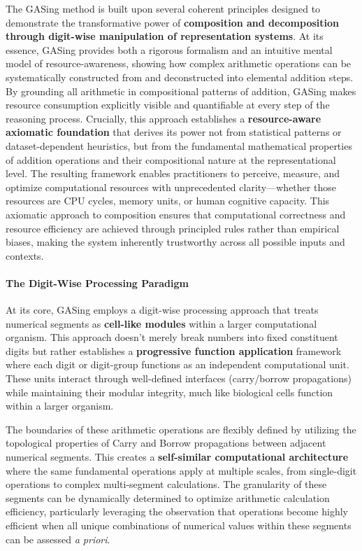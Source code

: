 The GASing method is built upon several coherent principles designed to demonstrate the transformative power of \textbf{composition and decomposition through digit-wise manipulation of representation systems}. At its essence, GASing provides both a rigorous formalism and an intuitive mental model of resource-awareness, showing how complex arithmetic operations can be systematically constructed from and deconstructed into elemental addition steps. By grounding all arithmetic in compositional patterns of addition, GASing makes resource consumption explicitly visible and quantifiable at every step of the reasoning process. Crucially, this approach establishes a \textbf{resource-aware axiomatic foundation} that derives its power not from statistical patterns or dataset-dependent heuristics, but from the fundamental mathematical properties of addition operations and their compositional nature at the representational level. The resulting framework enables practitioners to perceive, measure, and optimize computational resources with unprecedented clarity—whether those resources are CPU cycles, memory units, or human cognitive capacity. This axiomatic approach to composition ensures that computational correctness and resource efficiency are achieved through principled rules rather than empirical biases, making the system inherently trustworthy across all possible inputs and contexts.
\paragraph{The Digit-Wise Processing Paradigm}

At its core, GASing employs a digit-wise processing approach that treats numerical segments as \textbf{cell-like modules} within a larger computational organism. This approach doesn't merely break numbers into fixed constituent digits but rather establishes a \textbf{progressive function application} framework where each digit or digit-group functions as an independent computational unit. These units interact through well-defined interfaces (carry/borrow propagations) while maintaining their modular integrity, much like biological cells function within a larger organism.

The boundaries of these arithmetic operations are flexibly defined by utilizing the topological properties of Carry and Borrow propagations between adjacent numerical segments. This creates a \textbf{self-similar computational architecture} where the same fundamental operations apply at multiple scales, from single-digit operations to complex multi-segment calculations. The granularity of these segments can be dynamically determined to optimize arithmetic calculation efficiency, particularly leveraging the observation that operations become highly efficient when all unique combinations of numerical values within these segments can be assessed \emph{a priori}. 

